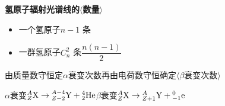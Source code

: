 \textbf{氢原子辐射光谱线的$\langle$数量$\rangle$} %
\begin{itemize}
\item[] 一个氢原子\quad $n-1$ 条
\item[] 一群氢原子\quad $C_n^2$ 条\quad $\dfrac{n(n-1)}{2}$
\end{itemize}
由质量数守恒定$\alpha$衰变次数\quad 再由电荷数守恒确定$\langle$$\beta$衰变次数$\rangle$ %

\noindent $\alpha$衰变\quad ${}^{A}_{Z}\mathrm{X}\to{}^{A-4}_{Z-2}\mathrm{Y}+{}^{4}_{2}\mathrm{He}$\qquad $\beta$衰变\quad ${}^{A}_{Z}\mathrm{X}\to{}^{A}_{Z+1}\mathrm{Y}+{}^{0}_{-1}\mathrm{e}$

